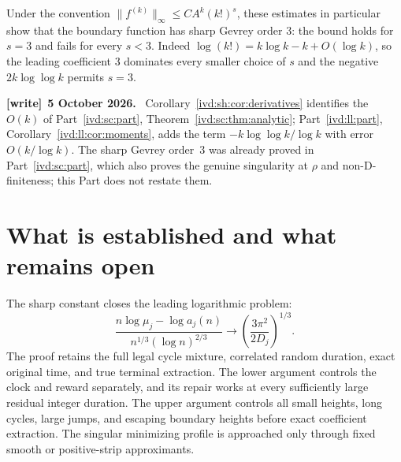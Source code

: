 \documentclass[11pt,letterpaper]{article}
\theoremstyle{remark}\newtheorem{remark}[theorem]{Remark}
\numberwithin{equation}{section}
\newenvironment{writenote}[1][]{\par\smallskip\begingroup\small
 \noindent\textbf{[write]}\if\relax\detokenize{#1}\relax\else~\textbf{#1.}\fi\ }%
 {\par\endgroup\smallskip}
\begin{document}
Under the convention
$\|f^{(k)}\|_\infty\le C A^k(k!)^s$, these estimates in particular
show that the boundary function has sharp Gevrey order $3$:
the bound holds for $s=3$ and fails for every $s<3$.
Indeed $\log(k!)=k\log k-k+O(\log k)$, so the leading coefficient
$3$ dominates every smaller choice of $s$ and the negative
$2k\log\log k$ permits $s=3$.
\begin{writenote}[5 October 2026]
Corollary~\ref{ivd:sh:cor:derivatives} identifies the $O(k)$ of Part~\ref{ivd:sc:part}, Theorem~\ref{ivd:sc:thm:analytic}; Part~\ref{ivd:ll:part}, Corollary~\ref{ivd:ll:cor:moments}, adds the term $-k\log\log k/\log k$ with error $O(k/\log k)$. The sharp Gevrey order~$3$ was already proved in Part~\ref{ivd:sc:part}, which also proves the genuine singularity at $\rho$ and non-D-finiteness; this Part does not restate them.
\end{writenote}

\section{What is established and what remains open}\label{ivd:sh:sec:open}
The sharp constant closes the leading logarithmic problem:
\[
 \frac{n\log\mu_j-\log a_j(n)}{n^{1/3}(\log n)^{2/3}}
 \longrightarrow\left(\frac{3\pi^2}{2D_j}\right)^{1/3}.
\]
The proof retains the full legal cycle mixture, correlated random
duration, exact original time, and true terminal extraction.
The lower argument controls the clock and reward separately, and its
repair works at every sufficiently large residual integer duration.
The upper argument controls all small heights, long cycles, large
jumps, and escaping boundary heights before exact coefficient
extraction. The singular minimizing profile is approached only through
fixed smooth or positive-strip approximants.
\end{document}
